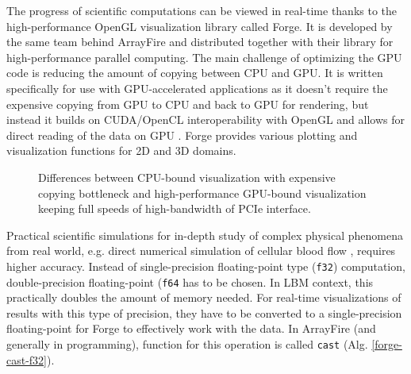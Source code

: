 The progress of scientific computations can be viewed in real-time thanks to the high-performance OpenGL visualization library called Forge. It is developed by the same team behind ArrayFire and distributed together with their library for high-performance parallel computing. The main challenge of optimizing the GPU code is reducing the amount of copying between CPU and GPU. It is written specifically for use with GPU-accelerated applications as it doesn't require the expensive copying from GPU to CPU and back to GPU for rendering, but instead it builds on CUDA/OpenCL interoperability with OpenGL and allows for direct reading of the data on GPU \citep{forge2016}. Forge provides various plotting and visualization functions for 2D and 3D domains.

\begin{figure}[!ht]
	\centering
	 \qquad
	\caption{Differences between CPU-bound visualization with expensive copying bottleneck and high-performance GPU-bound visualization keeping full speeds of high-bandwidth of PCIe interface.}
	\label{fig:viz-forge-main}
\end{figure}

Practical scientific simulations for in-depth study of complex physical phenomena from real world, e.g. direct numerical simulation of cellular blood flow \citep{kotsalosDigitalBloodMassively2019}, requires higher accuracy. Instead of single-precision floating-point type (\texttt{f32}) computation, double-precision floating-point (\texttt{f64} has to be chosen. In LBM context, this practically doubles the amount of memory needed. For real-time visualizations of results with this type of precision, they have to be converted to a single-precision floating-point for Forge to effectively work with the data. In ArrayFire (and generally in programming), function for this operation is called \texttt{cast} (Alg. \ref{forge-cast-f32}).

